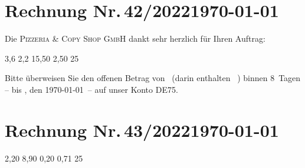 \documentclass[12pt]{scrartcl}		%
\begin{document}
\section*{Rechnung Nr.\,42/2022\hfill\today}	%

Die \textsc{Pizzeria \& Copy Shop GmbH} dankt sehr herzlich für Ihren Auftrag:

	\begin{invoice*}[B]				%
		\UseEuro					%
		\NumbersOn					%
		\SeparatorOff				%

				{3,6}
			{2,2}
									{15,50}
							{2,50}
					{25}
	\end{invoice*}

		\def\payperiod{8}			%

Bitte überweisen Sie den offenen Betrag von 
\Total\ (darin enthalten \TaxAmnt ~\TaxAbrv) 
binnen \payperiod~Tagen – bis \DayName{\year}{\month}{\day+\payperiod}, 
den \AdvanceDate[\payperiod]\today\ – 
auf unser Konto DE75.

\AdvanceDate[-\payperiod]		%

\section*{Rechnung Nr.\,43/2022\hfill\today}
	\begin{invoice}[N]				%
		\NumbersOff					%
		\SeparatorOff				%
			{2,20}
									{8,90}
								{0,20}
							{0,71}
						{25}
	\end{invoice}
\end{document}
